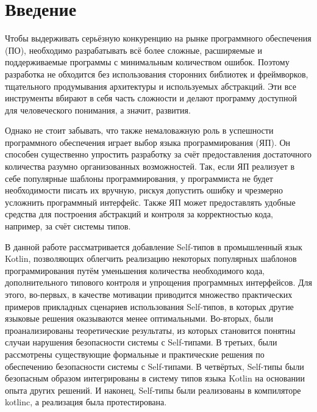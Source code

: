 \section*{Введение}

Чтобы выдерживать серьёзную конкуренцию на рынке программного обеспечения (ПО), необходимо разрабатывать всё более сложные, расширяемые и поддерживаемые программы с минимальным количеством ошибок.
Поэтому разработка не обходится без использования сторонних библиотек и фреймворков, тщательного продумывания архитектуры и используемых абстракций.
Эти все инструменты вбирают в себя часть сложности и делают программу доступной для человеческого понимания, а значит, развития.

Однако не стоит забывать, что также немаловажную роль в успешности программного обеспечения играет выбор языка программирования (ЯП).
Он способен существенно упростить разработку за счёт предоставления достаточного количества разумно организованных возможностей.
Так, если ЯП реализует в себе популярные шаблоны программирования, у программиста не будет необходимости писать их вручную, рискуя допустить ошибку и чрезмерно усложнить программный интерфейс.
Также ЯП может предоставлять удобные средства для построения абстракций и контроля за корректностью кода, например, за счёт системы типов.

В данной работе рассматривается добавление Self-типов в промышленный язык Kotlin, позволяющих облегчить реализацию некоторых популярных шаблонов программирования путём уменьшения количества необходимого кода, дополнительного типового контроля и упрощения программных интерфейсов.
Для этого, во-первых, в качестве мотивации приводится множество практических примеров прикладных сценариев использования Self-типов, в которых другие языковые решения оказываются менее оптимальными.
Во-вторых, были проанализированы теоретические результаты, из которых становится понятны случаи нарушения безопасности системы с Self-типами.
В третьих, были рассмотрены существующие формальные и практические решения по обеспечению безопасности системы с Self-типами.
В четвёртых, Self-типы были безопасным образом интегрированы в систему типов языка Kotlin на основании опыта других решений.
И наконец, Self-типы были реализованы в компиляторе kotlinc, а реализация была протестирована.

